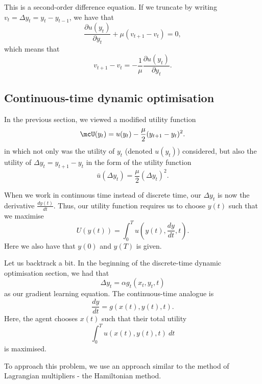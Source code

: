 \documentclass[a4paper, 12pt,oneside,openany]{book}
\begin{document}
This is a second-order difference equation. If we truncate by writing $v_t = \Delta y_t = y_t-y_{t-1}$, we have that $$\frac{\partial u(y_t)}{\partial y_t} + \mu(v_{t+1}-v_t)=0,$$ which means that $$v_{t+1}-v_t = -\frac{1}{\mu} \frac{\partial u(y_t)}{\partial y_t}.$$

\subsection{Continuous-time dynamic optimisation}

In the previous section, we viewed a modified utility function $$\mcU(y_t) = u(y_t) - \frac{\mu}{2} (y_{t+1}-y_t)^2.$$ in which not only was the utility of $y_t$ (denoted $u(y_t)$) considered, but also the utility of $\Delta y_t = y_{t+1}-y_t$ in the form of the utility function $$\bar{u}(\Delta y_t) = \frac{\mu}{2} (\Delta y_t)^2.$$

When we work in continuous time instead of discrete time, our $\Delta y_t$ is now the derivative $\frac{dy(t)}{dt}$. Thus, our utility function requires us to choose $y(t)$ such that we maximise $$U(y(t)) = \int_0^T u\left(y(t), \frac{dy}{dt}, t \right).$$ Here we also have that $y(0)$ and $y(T)$ is given. 

Let us backtrack a bit. In the beginning of the discrete-time dynamic optimisation section, we had that $$\Delta y_t = \alpha g_t(x_t, y_t, t)$$ as our gradient learning equation. The continuous-time analogue is \begin{equation} \frac{dy}{dt} = g(x(t), y(t), t).\end{equation} Here, the agent chooses $x(t)$ such that their total utility $$\int_0^T u(x(t), y(t), t)\ dt$$ is maximised. 

To approach this problem, we use an approach similar to the method of Lagrangian multipliers - the Hamiltonian method.

\end{document}
